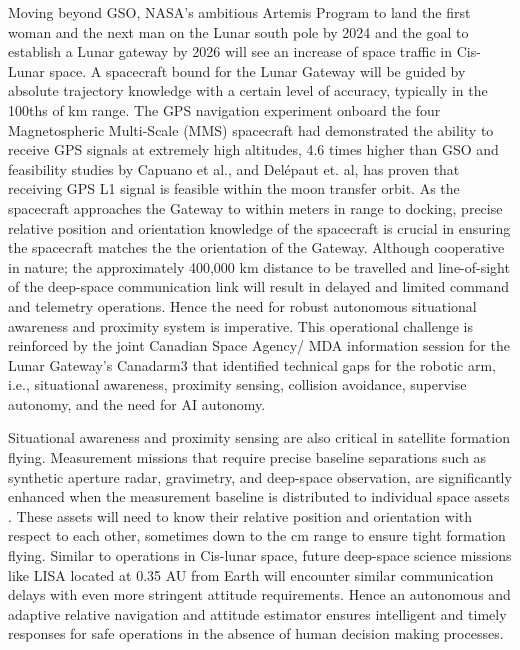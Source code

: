 Moving beyond GSO, NASA’s ambitious Artemis Program to land the first woman and the next man on the Lunar south pole by 2024 \cite{nasaArtermis20} and the goal to establish a Lunar gateway \cite{winternitzGpsLunarGateway19} by 2026 will see an increase of space traffic in Cis-Lunar space. A spacecraft bound for the Lunar Gateway will be guided by absolute trajectory knowledge with a certain level of accuracy, typically in the 100ths of km range. The GPS navigation experiment onboard the four Magnetospheric Multi-Scale (MMS) spacecraft had demonstrated the ability to receive GPS signals at extremely high altitudes, 4.6 times higher than GSO \cite{winternitzGpsLunarGateway19} and feasibility studies by Capuano et al.,  \cite{capuanoGpsLunarNav16} and Delépaut et. al, \cite{DelepautGpsLunarNav16} has proven that receiving GPS L1 signal is feasible within the moon transfer orbit. As the spacecraft approaches the Gateway to within meters in range to docking, precise relative position and orientation knowledge of the spacecraft is crucial in ensuring the spacecraft matches the the orientation of the Gateway. Although cooperative in nature; the approximately 400,000 km distance to be travelled  and line-of-sight of the deep-space communication link will result in delayed and limited command and telemetry operations. Hence the need for robust autonomous situational awareness and proximity system is imperative. This operational challenge is reinforced by the joint Canadian Space Agency/ MDA information session for the Lunar Gateway’s Canadarm3 \footnotemark[8]{} that identified technical gaps for the robotic arm, i.e., situational awareness, proximity sensing, collision avoidance, supervise autonomy, and the need for AI autonomy.

Situational awareness and proximity sensing are also critical in satellite formation flying. Measurement missions that require precise baseline separations such as synthetic aperture radar, gravimetry, and deep-space observation, are significantly enhanced when the measurement baseline is distributed to individual space assets \cite{frasierAdaptiveKF18}. These assets will need to know their relative position and orientation with respect to each other, sometimes down to the cm range to ensure tight formation flying.  Similar to operations in Cis-lunar space, future deep-space science missions like LISA located at 0.35 AU from Earth \cite{amatoFormationFlying19} will encounter similar communication delays with even more stringent attitude requirements. Hence an autonomous and adaptive relative navigation and attitude estimator ensures intelligent and timely responses for safe operations in the absence of human decision making processes.     

